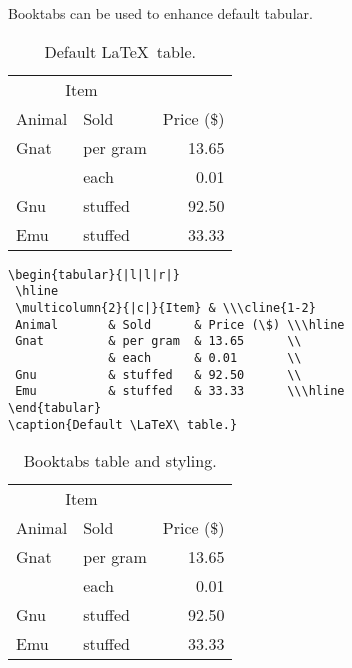 \begin{frame}{\href{https://ctan.org/pkg/booktabs?lang=en}%
                   {}}
  Booktabs can be used to enhance default tabular.
  \begin{table}
    \begin{tabular}{|l|l|r|}
      \hline
      \multicolumn{2}{|c|}{Item} &             \\ \cline{1-2}
      Animal & Sold              & Price (\$) \\ \hline
      Gnat   & per gram           & 13.65       \\
              & each              & 0.01        \\
      Gnu     & stuffed           & 92.50      \\
      Emu     & stuffed           & 33.33      \\
      \hline
    \end{tabular}
     \caption{Default \LaTeX\ table.}
  \end{table}
\end{frame}

\begin{frame}[fragile]{\href{https://ctan.org/pkg/booktabs?lang=en}%
                            {}}
  \begin{lstlisting}
\begin{tabular}{|l|l|r|}
 \hline
 \multicolumn{2}{|c|}{Item} & \\\cline{1-2}
 Animal       & Sold      & Price (\$) \\\hline
 Gnat         & per gram  & 13.65      \\
              & each      & 0.01       \\
 Gnu          & stuffed   & 92.50      \\
 Emu          & stuffed   & 33.33      \\\hline
\end{tabular}
\caption{Default \LaTeX\ table.}
  \end{lstlisting}
\end{frame}

\begin{frame}[fragile]{\href{https://ctan.org/pkg/booktabs?lang=en}%
                            {}}
  \begin{table}
    \begin{tabular}{llr}
      \toprule
      \multicolumn{2}{c}{Item}   &             \\ \cmidrule{1-2}
      Animal & Sold              & Price (\$) \\ \midrule
      Gnat   & per gram           & 13.65       \\
              & each              & 0.01        \\
      Gnu     & stuffed           & 92.50      \\
      Emu     & stuffed           & 33.33      \\
      \bottomrule
    \end{tabular}
    \caption{Booktabs table and styling.}
  \end{table}
\end{frame}

